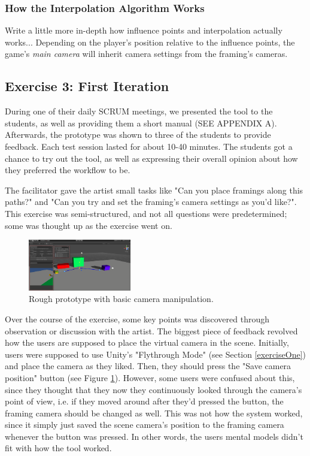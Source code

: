 \subsubsection{How the Interpolation Algorithm Works}
Write a little more in-depth how influence points and interpolation actually works...
Depending on the player's position relative to the influence points, the game's \textit{main camera} will inherit camera settings from the framing's cameras.





\subsection{Exercise 3: First Iteration}
During one of their daily SCRUM meetings, we presented the tool to the students, as well as providing them a short manual (SEE APPENDIX A). Afterwards, the prototype was shown to three of the students to provide feedback. Each test session lasted for about 10-40 minutes. The students got a chance to try out the tool, as well as expressing their overall opinion about how they preferred the workflow to be.

The facilitator gave the artist small tasks like "Can you place framings along this paths?" and "Can you try and set the framing's camera settings as you'd like?". This exercise was semi-structured, and not all questions were predetermined; some was thought up as the exercise went on.

\begin{figure}[htbp]
\centering
\includegraphics[width=0.40\textwidth]{Pics/MainSetup}
\caption{Rough prototype with basic camera manipulation.}
\label{fig:prototype}
\end{figure}

Over the course of the exercise, some key points was discovered through observation or discussion with the artist. The biggest piece of feedback revolved how the users are supposed to place the virtual camera in the scene. Initially, users were supposed to use Unity's "Flythrough Mode" (see Section \ref{exerciseOne}) and place the camera as they liked. Then, they should press the "Save camera position" button (see Figure \ref{fig:prototype}). However, some users were confused about this, since they thought that they now they continuously looked through the camera's point of view, i.e. if they moved around after they'd pressed the button, the framing camera should be changed as well. This was not how the system worked, since it simply just saved the scene camera's position to the framing camera whenever the button was pressed. In other words, the users mental models didn't fit with how the tool worked.
